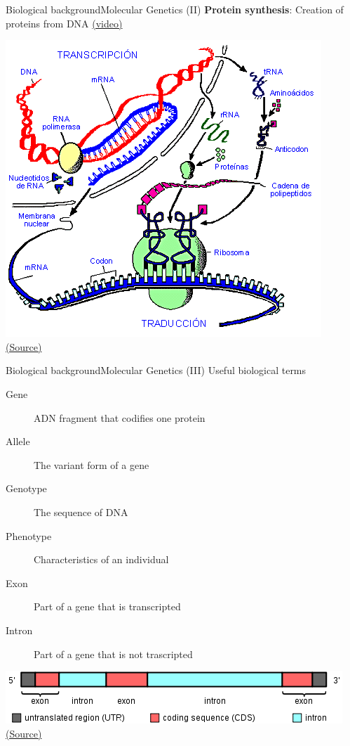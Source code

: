 \documentclass[10pt,compress]{beamer} %
\begin{document}
\begin{frame}[plain]{Biological background}{Molecular Genetics (II)}
		\textbf{Protein synthesis}: Creation of proteins from DNA \href{https://www.youtube.com/watch?v=gG7uCskUOrA}{(video)}
		\begin{center}
		\includegraphics[width=0.7\linewidth]{figs/sintesis.png}\\
		\tiny \href{http://www.virtual.unal.edu.co/cursos/ingenieria/2001832/lecciones/traduccion.html}{(Source)}
		\end{center}
\end{frame}

\begin{frame}{Biological background}{Molecular Genetics (III)}
	Useful biological terms
	\begin{description}
	\item[Gene] ADN fragment that codifies one protein
	\item[Allele] The variant form of a gene
	\item[Genotype] The sequence of DNA
	\item[Phenotype] Characteristics of an individual
	\item[Exon] Part of a gene that is transcripted
	\item[Intron] Part of a gene that is not trascripted
	\end{description}

	\begin{center}
	\includegraphics[width=0.7\linewidth]{figs/exon.png}\\
	\tiny \href{https://en.wikipedia.org/wiki/Exon}{(Source)}
	\end{center}
\end{frame}
\end{document}
